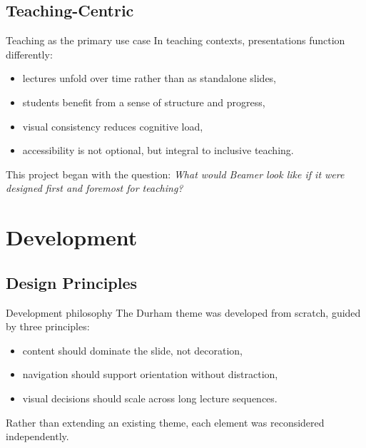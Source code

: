 \documentclass[aspectratio=169]{beamer}
\begin{document}
\subsection{Teaching-Centric}
\begin{frame}{Teaching as the primary use case}
In teaching contexts, presentations function differently:
\begin{itemize}
  \item lectures unfold over time rather than as standalone slides,
  \item students benefit from a sense of structure and progress,
  \item visual consistency reduces cognitive load,
  \item accessibility is not optional, but integral to inclusive teaching.
\end{itemize}

\vspace{0.6em}
This project began with the question:  
\emph{What would Beamer look like if it were designed first and foremost for teaching?}
\end{frame}

\section{Development}
\subsection{Design Principles}

\begin{frame}{Development philosophy}
The Durham theme was developed from scratch, guided by three principles:
\begin{itemize}
  \item content should dominate the slide, not decoration,
  \item navigation should support orientation without distraction,
  \item visual decisions should scale across long lecture sequences.
\end{itemize}

\vspace{0.6em}
Rather than extending an existing theme, each element was reconsidered independently.
\end{frame}
\end{document}
